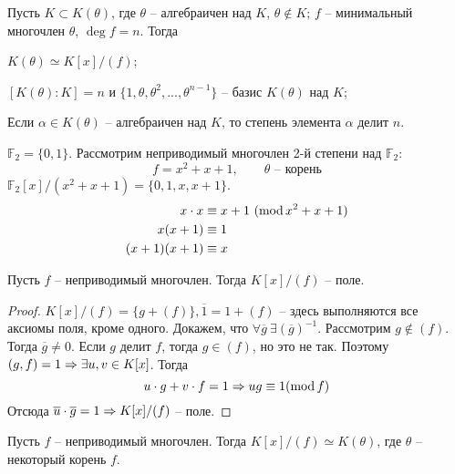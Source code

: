 \begin{Thm}
	Пусть $K \subset K(\theta)$, где $\theta$ -- алгебраичен над $K$, $\theta \notin K$; $f$ -- минимальный многочлен $\theta$, $\deg f = n$.
	Тогда 
	\begin{MyList}
		\item $K(\theta) \simeq K[x] / (f)$;
		\item $[K(\theta) : K] = n$ и $\{1, \theta, \theta^2, ..., \theta^{n - 1}\}$ -- базис $K(\theta)$ над $K$;
		\item Если $\alpha \in K(\theta)$ -- алгебраичен над $K$, то степень элемента $\alpha$ делит $n$.  
	\end{MyList} 
\end{Thm}

\begin{Example}
	$\mathbb{F}_2 = \{0, 1\}$. Рассмотрим неприводимый многочлен 2-й степени над $\mathbb{F}_2$:
	\[f = x^2 + x + 1, \qquad \theta \text{ -- корень}\]
	$\mathbb{F}_2[x] / (x^2 + x + 1) = \{0, 1, x, x + 1\}$.
	\begin{align*}
		x \cdot x &\equiv x + 1 \ (\mathrm{mod}\, x^2 + x + 1) \\
		x (x + 1) &\equiv 1 \\
		(x + 1)(x + 1) &\equiv x
	\end{align*}

\end{Example}

\begin{Lm}
	Пусть $f$ -- неприводимый многочлен. Тогда $K[x]/(f)$ -- поле.
\end{Lm}

\begin{proof}
	$K[x]/(f) = \{g + (f)\}, \overline{1} = 1 + (f)$ -- здесь выполняются все аксиомы поля, кроме одного.
	Докажем, что $\forall \overline{g} \ \exists (\overline{g})^{-1}$. Рассмотрим $g \notin (f)$. Тогда $\overline{g} \neq 0$. Если $g$ делит $f$, тогда $g \in (f)$, но это не так.
	Поэтому $(g, f) = 1 \Rightarrow \exists u, v \in K[x]$. Тогда
	\[u \cdot g + v \cdot f = 1 \Rightarrow ug \equiv 1 (\mathrm{mod}\, f)\]
	Отсюда $\overline{u} \cdot \overline{g} = 1 \Rightarrow K[x] / (f)$ -- поле.
\end{proof}

\begin{Thm}
	Пусть $f$ -- неприводимый многочлен. Тогда $K[x] / (f) \simeq K(\theta)$, где $\theta$ -- некоторый корень $f$.  
\end{Thm}


